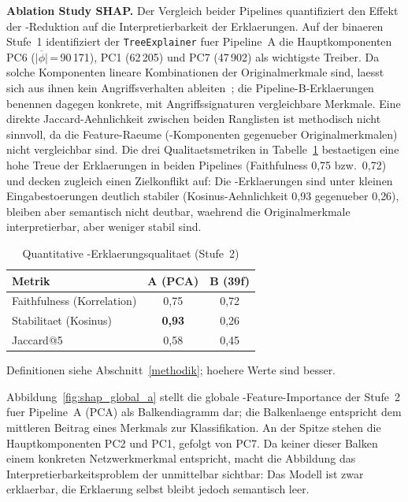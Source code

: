 \textbf{Ablation Study SHAP.}
Der Vergleich beider Pipelines quantifiziert den Effekt der \pca{}-Reduktion auf die
Interpretierbarkeit der Erklaerungen.
Auf der binaeren Stufe~1 identifiziert der \texttt{TreeExplainer} fuer Pipeline~A die
Hauptkomponenten PC6 ($\overline{|\phi|}$\,=\,90\,171), PC1 (62\,205) und PC7 (47\,902) als
wichtigste Treiber.
Da solche Komponenten lineare Kombinationen der Originalmerkmale sind, laesst sich aus ihnen
kein Angriffsverhalten ableiten~\cite{alharby2025ciciot}; die Pipeline-B-Erklaerungen benennen
dagegen konkrete, mit Angriffssignaturen vergleichbare Merkmale.
Eine direkte Jaccard-Aehnlichkeit zwischen beiden Ranglisten ist methodisch nicht sinnvoll, da
die Feature-Raeume (\pca{}-Komponenten gegenueber Originalmerkmalen) nicht vergleichbar sind.
Die drei Qualitaetsmetriken in Tabelle~\ref{tab:shap_quality} bestaetigen eine hohe Treue der
Erklaerungen in beiden Pipelines (Faithfulness 0{,}75 bzw.\ 0{,}72) und decken zugleich einen
Zielkonflikt auf: Die \pca{}-Erklaerungen sind unter kleinen Eingabestoerungen deutlich stabiler
(Kosinus-Aehnlichkeit 0{,}93 gegenueber 0{,}26), bleiben aber semantisch nicht deutbar, waehrend
die Originalmerkmale interpretierbar, aber weniger stabil sind.

\begin{table}[h]
\centering
\caption{Quantitative \shap{}-Erklaerungsqualitaet (Stufe~2)}
\label{tab:shap_quality}
\begin{tabular}{lcc}
\toprule
Metrik & A (PCA) & B (39f) \\
\midrule
Faithfulness (Korrelation) & 0{,}75 & 0{,}72 \\
Stabilitaet (Kosinus) & \textbf{0{,}93} & 0{,}26 \\
Jaccard@5 & 0{,}58 & 0{,}45 \\
\bottomrule
\end{tabular}
\smallskip\newline
{\footnotesize Definitionen siehe Abschnitt~\ref{methodik}; hoehere Werte sind besser.}
\end{table}

Abbildung~\ref{fig:shap_global_a} stellt die globale \shap{}-Feature-Importance der Stufe~2 fuer
Pipeline~A (PCA) als Balkendiagramm dar; die Balkenlaenge entspricht dem mittleren Beitrag eines
Merkmals zur Klassifikation.
An der Spitze stehen die Hauptkomponenten PC2 und PC1, gefolgt von PC7.
Da keiner dieser Balken einem konkreten Netzwerkmerkmal entspricht, macht die Abbildung das
Interpretierbarkeitsproblem der \pca{} unmittelbar sichtbar: Das Modell ist zwar erklaerbar,
die Erklaerung selbst bleibt jedoch semantisch leer.

